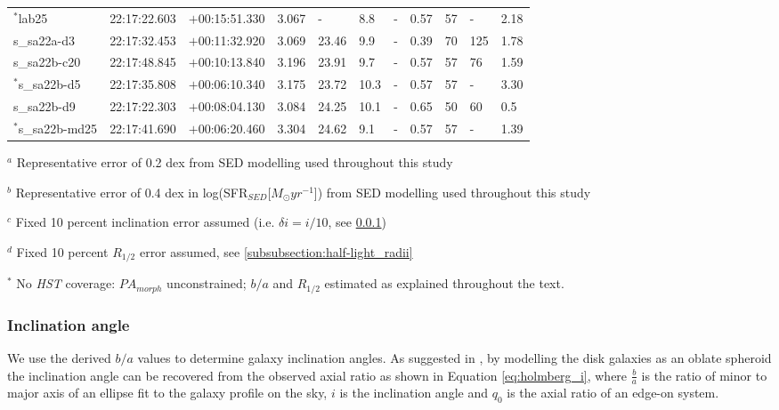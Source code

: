 \documentclass[fleqn,usenatbib]{mn2e}
\begin{document}
\begin{table*}
\begin{threeparttable}
\begin{tabular}{lllllllllll}
$^{*}$lab25         & 22:17:22.603 & $+$00:15:51.330 & 3.067      & -    & 8.8  & -            & 0.57         & 57        & -    & 2.18      \\
s\_sa22a-d3   & 22:17:32.453 & $+$00:11:32.920 & 3.069 & 23.46 & 9.9  & -            & 0.39        & 70        & 125   & 1.78      \\
s\_sa22b-c20  & 22:17:48.845 & $+$00:10:13.840 & 3.196     & 23.91 & 9.7  & -            & 0.57        & 57        & 76    & 1.59      \\
$^{*}$s\_sa22b-d5  & 22:17:35.808 & $+$00:06:10.340 & 3.175 & 23.72 & 10.3 & -            & 0.57         & 57        & -    & 3.30      \\
s\_sa22b-d9   & 22:17:22.303 & $+$00:08:04.130 & 3.084    & 24.25 & 10.1 & -            & 0.65        & 50        & 60   & 0.5       \\
$^{*}$s\_sa22b-md25 & 22:17:41.690 & $+$00:06:20.460 & 3.304     & 24.62 & 9.1  & -            & 0.57         & 57        & -    & 1.39      

\end{tabular}
\begin{tablenotes}
      \small
      \item $^{a}$ Representative error of 0.2 dex from SED modelling used throughout this study
      \item $^{b}$ Representative error of 0.4 dex in log(SFR$_{SED}$[$M_{\odot}yr^{-1}$]) from SED modelling used throughout this study
      \item $^{c}$ Fixed 10 percent inclination error assumed (i.e. $\delta i = i / 10$, see \protect\cref{subsubsection:inclination_angle})
      \item $^{d}$ Fixed 10 percent $R_{1/2}$ error assumed, see \protect\cref{subsubsection:half-light_radii}
      \item $^{*}$ No {\em HST} coverage: $PA_{morph}$ unconstrained; $b/a$ and $R_{1/2}$ estimated as explained throughout the text.
    \end{tablenotes}
  \end{threeparttable}
  \end{table*}


\subsubsection{Inclination angle}\label{subsubsection:inclination_angle}
We use the derived $b/a$ values to determine galaxy inclination angles.
As suggested in \cite{Holmberg1958}, by modelling the disk galaxies as an oblate spheroid the inclination angle can be recovered from the observed axial ratio as shown in Equation \ref{eq:holmberg_i}, where $\frac{b}{a}$ is the ratio of minor to major axis of an ellipse fit to the galaxy profile on the sky, $i$ is the inclination angle and $q_{0}$ is the axial ratio of an edge-on system.
\end{document}
